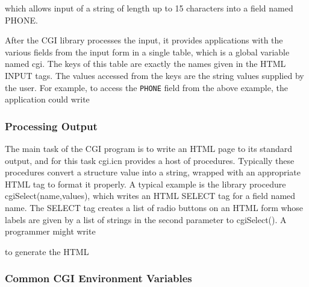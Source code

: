 
\noindent
which allows input of a string of length up to 15 characters into a
field named \textsf{PHONE}.

After the CGI library processes the input, it provides applications with
the various fields from the input form in a single table, which is a
global variable named \textsf{cgi}. The keys of this table are exactly
the names given in the HTML \textsf{INPUT} tags. The values accessed
from the keys are the string values supplied by the user. For example,
to access the \texttt{PHONE} field from the above example, the
application could write 


\subsubsection{Processing Output}

The main task of the CGI program is to write an HTML page to its
standard output, and for this task \textsf{cgi.icn} provides a host of
procedures. Typically these procedures convert a structure value into a
string, wrapped with an appropriate HTML tag to format it properly. A
typical example is the library procedure
\textsf{cgiSelect(name,values)}, which writes an HTML \textsf{SELECT}
tag for a field named name. The \textsf{SELECT} tag creates a list of
radio buttons on an HTML form whose labels are given by a list of
strings in the second parameter to \textsf{cgiSelect()}. A programmer
might write


to generate the HTML


\subsubsection[Common CGI Environment Variables]{Common CGI Environment
Variables}


